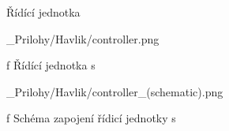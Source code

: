 \app Řídící jednotka

\medskip {}
\picw=10cm _Prilohy/Havlik/controller.png
\caption/f Řídící jednotka s 
\medskip

\medskip {}
\picw=15cm _Prilohy/Havlik/controller_(schematic).png
\caption/f Schéma zapojení řídicí jednotky s 
\medskip

\par